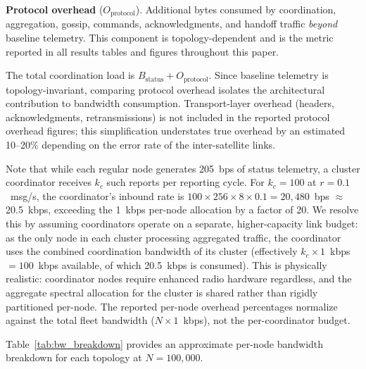 \documentclass[journal]{IEEEtran}
\begin{document}
\textbf{Protocol overhead} ($O_{\text{protocol}}$). Additional bytes consumed by coordination, aggregation, gossip, commands, acknowledgments, and handoff traffic \emph{beyond} baseline telemetry. This component is topology-dependent and is the metric reported in all results tables and figures throughout this paper.

The total coordination load is $B_{\text{status}} + O_{\text{protocol}}$. Since baseline telemetry is topology-invariant, comparing protocol overhead isolates the architectural contribution to bandwidth consumption. Transport-layer overhead (headers, acknowledgments, retransmissions) is not included in the reported protocol overhead figures; this simplification understates true overhead by an estimated 10--20\% depending on the error rate of the inter-satellite links.

Note that while each regular node generates 205~bps of status telemetry, a cluster coordinator receives $k_c$ such reports per reporting cycle. For $k_c = 100$ at $r = 0.1$~msg/s, the coordinator's inbound rate is $100 \times 256 \times 8 \times 0.1 = 20{,}480$~bps $\approx$ 20.5~kbps, exceeding the 1~kbps per-node allocation by a factor of 20. We resolve this by assuming coordinators operate on a separate, higher-capacity link budget: as the only node in each cluster processing aggregated traffic, the coordinator uses the combined coordination bandwidth of its cluster (effectively $k_c \times 1$~kbps $= 100$~kbps available, of which 20.5~kbps is consumed). This is physically realistic: coordinator nodes require enhanced radio hardware regardless, and the aggregate spectral allocation for the cluster is shared rather than rigidly partitioned per-node. The reported per-node overhead percentages normalize against the total fleet bandwidth ($N \times 1$~kbps), not the per-coordinator budget.

Table~\ref{tab:bw_breakdown} provides an approximate per-node bandwidth breakdown for each topology at $N = 100{,}000$.
\end{document}

